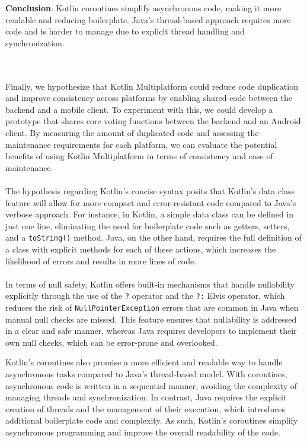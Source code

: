 \textbf{Conclusion}: Kotlin coroutines simplify asynchronous code, making it more readable and reducing boilerplate. Java’s thread-based approach requires more code and is harder to manage due to explicit thread handling and synchronization.

\\
\\
Finally, we hypothesize that Kotlin Multiplatform could reduce code duplication and improve consistency across platforms by enabling shared code between the backend and a mobile client. To experiment with this, we could develop a prototype that shares core voting functions between the backend and an Android client. By measuring the amount of duplicated code and assessing the maintenance requirements for each platform, we can evaluate the potential benefits of using Kotlin Multiplatform in terms of consistency and ease of maintenance.
\\
\\
The hypothesis regarding Kotlin’s concise syntax posits that Kotlin’s data class feature will allow for more compact and error-resistant code compared to Java's verbose approach. For instance, in Kotlin, a simple data class can be defined in just one line, eliminating the need for boilerplate code such as getters, setters, and a \texttt{toString()} method. Java, on the other hand, requires the full definition of a class with explicit methods for each of these actions, which increases the likelihood of errors and results in more lines of code.
\\
\\
In terms of null safety, Kotlin offers built-in mechanisms that handle nullability explicitly through the use of the \texttt{?} operator and the \texttt{?:} Elvis operator, which reduces the risk of \texttt{NullPointerException} errors that are common in Java when manual null checks are missed. This feature ensures that nullability is addressed in a clear and safe manner, whereas Java requires developers to implement their own null checks, which can be error-prone and overlooked.

Kotlin’s coroutines also promise a more efficient and readable way to handle asynchronous tasks compared to Java’s thread-based model. With coroutines, asynchronous code is written in a sequential manner, avoiding the complexity of managing threads and synchronization. In contrast, Java requires the explicit creation of threads and the management of their execution, which introduces additional boilerplate code and complexity. As such, Kotlin’s coroutines simplify asynchronous programming and improve the overall readability of the code.

